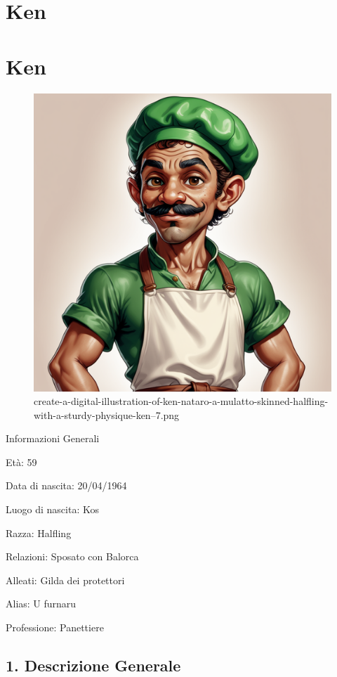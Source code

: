 \section{Ken}
\section{Ken}


\begin{figure}
\centering
\includegraphics{create-a-digital-illustration-of-ken-nataro-a-mulatto-skinned-halfling-with-a-sturdy-physique-ken--7.png}
\caption{create-a-digital-illustration-of-ken-nataro-a-mulatto-skinned-halfling-with-a-sturdy-physique-ken--7.png}
\end{figure}

Informazioni Generali

Età: 59

Data di nascita: 20/04/1964

Luogo di nascita: Kos

Razza: Halfling

Relazioni: Sposato con Balorca

Alleati: Gilda dei protettori

Alias: U furnaru

Professione: Panettiere


\subsection{1. Descrizione Generale}\label{descrizione-generale}


